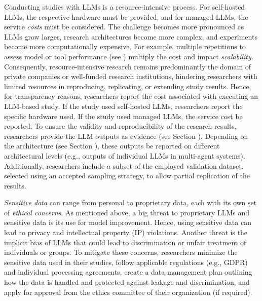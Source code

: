 Conducting studies with LLMs is a resource-intensive process.
For self-hosted LLMs, the respective hardware must be provided, and for managed LLMs, the service \emph{costs} must be considered.
The challenge becomes more pronounced as LLMs grow larger, research architectures become more complex, and experiments become more computationally expensive.
For example, multiple repetitions to assess model or tool performance (see \benchmarksmetrics) multiply the cost and impact \emph{scalability}.
Consequently, resource-intensive research remains predominantly the domain of private companies or well-funded research institutions, hindering researchers with limited resources in reproducing, replicating, or extending study results.
Hence, for transparency reasons, researchers \should report the cost associated with executing an LLM-based study. 
If the study used self-hosted LLMs, researchers \should report the specific hardware used. 
If the study used managed LLMs, the service cost \should be reported.
To ensure the validity and reproducibility of the research results, researchers \must provide the LLM outputs as evidence (see Section \prompts).
Depending on the architecture (see Section \toolarchitecture), these outputs \should be reported on different architectural levels (e.g., outputs of individual LLMs in multi-agent systems).
Additionally, researchers \should include a subset of the employed validation dataset, selected using an accepted sampling strategy, to allow partial replication of the results.

\emph{Sensitive data} can range from personal to proprietary data, each with its own set of \emph{ethical concerns}.
As mentioned above, a big threat to proprietary LLMs and sensitive data is its use for model improvement.
Hence, using sensitive data can lead to privacy and intellectual property (IP) violations.
Another threat is the implicit bias of LLMs that could lead to discrimination or unfair treatment of individuals or groups.
To mitigate these concerns, researchers \should minimize the sensitive data used in their studies, \must follow applicable regulations (e.g., GDPR) and individual processing agreements, \should create a data management plan outlining how the data is handled and protected against leakage and discrimination, and \must apply for approval from the ethics committee of their organization (if required).


